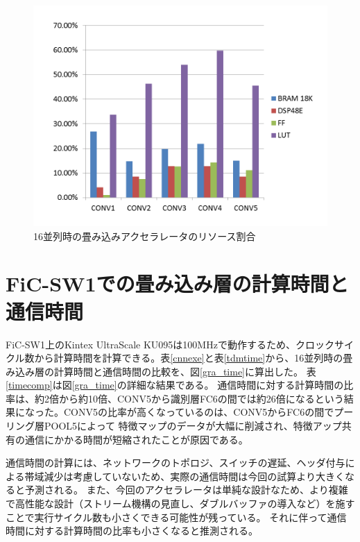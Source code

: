 \begin{figure}[ht]  
 \begin{center}   
	\includegraphics[width=1.0\columnwidth,bb=0 0 720 540]{img/resource.png}
  \caption{16並列時の畳み込みアクセラレータのリソース割合}
  \label{gra_resource}  
 \end{center}  
\end{figure}


\section{FiC-SW1での畳み込み層の計算時間と通信時間}
FiC-SW1上のKintex UltraScale KU095は100MHzで動作するため、クロックサイクル数から計算時間を計算できる。表\ref{cnnexe}と表\ref{tdmtime}から、16並列時の畳み込み層の計算時間と通信時間の比較を、図\ref{gra_time}に算出した。
表\ref{timecomp}は図\ref{gra_time}の詳細な結果である。
通信時間に対する計算時間の比率は、約2倍から約10倍、CONV5から識別層FC6の間では約26倍になるという結果になった。CONV5の比率が高くなっているのは、CONV5からFC6の間でプーリング層POOL5によって
特徴マップのデータが大幅に削減され、特徴アップ共有の通信にかかる時間が短縮されたことが原因である。

通信時間の計算には、ネットワークのトポロジ、スイッチの遅延、ヘッダ付与による帯域減少は考慮していないため、実際の通信時間は今回の試算より大きくなると予測される。
また、今回のアクセラレータは単純な設計なため、より複雑で高性能な設計（ストリーム機構の見直し、ダブルバッファの導入など）を施すことで実行サイクル数も小さくできる可能性が残っている。
それに伴って通信時間に対する計算時間の比率も小さくなると推測される。

